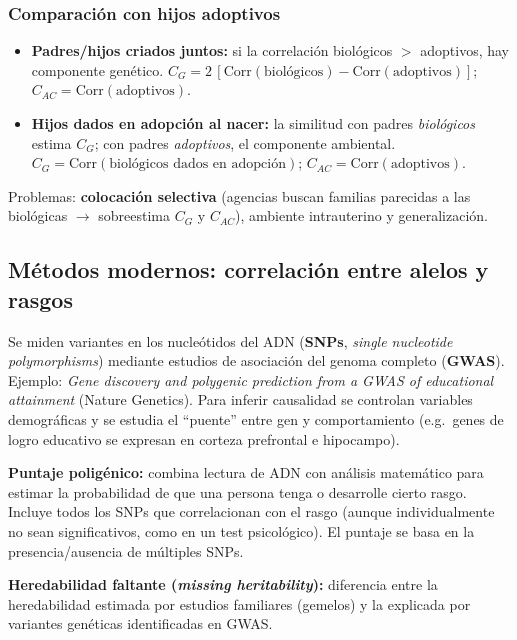 \documentclass[11pt, a4paper]{article}
\begin{document}
\subsubsection{Comparaci\'on con hijos adoptivos}

\begin{itemize}[nosep]
    \item \textbf{Padres/hijos criados juntos:} si la correlaci\'on biol\'ogicos $>$ adoptivos, hay componente gen\'etico. $C_G = 2\,[\mathrm{Corr}(\text{biol\'ogicos}) - \mathrm{Corr}(\text{adoptivos})]$; $C_{AC} = \mathrm{Corr}(\text{adoptivos})$.
    \item \textbf{Hijos dados en adopci\'on al nacer:} la similitud con padres \emph{biol\'ogicos} estima $C_G$; con padres \emph{adoptivos}, el componente ambiental. $C_G = \mathrm{Corr}(\text{biol\'ogicos dados en adopci\'on})$; $C_{AC} = \mathrm{Corr}(\text{adoptivos})$.
\end{itemize}
Problemas: \textbf{colocaci\'on selectiva} (agencias buscan familias parecidas a las biol\'ogicas $\to$ sobreestima $C_G$ y $C_{AC}$), ambiente intrauterino y generalizaci\'on.

\subsection{M\'etodos modernos: correlaci\'on entre alelos y rasgos}

Se miden variantes en los nucle\'otidos del ADN (\textbf{SNPs}, \emph{single nucleotide polymorphisms}) mediante estudios de asociaci\'on del genoma completo (\textbf{GWAS}). Ejemplo: \textit{Gene discovery and polygenic prediction from a GWAS of educational attainment} (Nature Genetics). Para inferir causalidad se controlan variables demogr\'aficas y se estudia el ``puente'' entre gen y comportamiento (e.g.\ genes de logro educativo se expresan en corteza prefrontal e hipocampo).

\textbf{Puntaje poligénico:} combina lectura de ADN con an\'alisis matem\'atico para estimar la probabilidad de que una persona tenga o desarrolle cierto rasgo. Incluye todos los SNPs que correlacionan con el rasgo (aunque individualmente no sean significativos, como en un test psicol\'ogico). El puntaje se basa en la presencia/ausencia de m\'ultiples SNPs.

\textbf{Heredabilidad faltante (\emph{missing heritability}):} diferencia entre la heredabilidad estimada por estudios familiares (gemelos) y la explicada por variantes gen\'eticas identificadas en GWAS.
\end{document}
